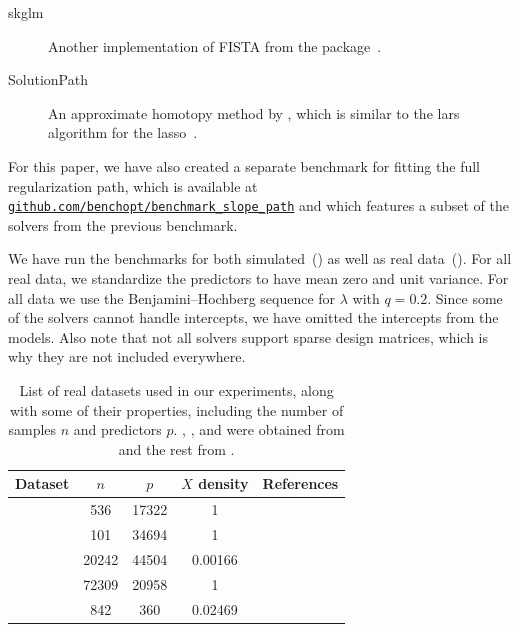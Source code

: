 \documentclass[article]{jss}
\let\Cref\crtCref
\newcommand{\myurl}[1]{\href{https://#1}{\nolinkurl{#1}}}
\begin{document}
\begin{description}
  \item[skglm] Another implementation of FISTA from the
         package~\citep{bertrand2022}.

  \item[SolutionPath] An approximate homotopy method by \citet{dupuis2024},
        which is similar to the lars algorithm for the lasso~\citep{efron2004}.
\end{description}

For this paper, we have also created a separate benchmark for fitting the full
regularization path, which is available at
\myurl{github.com/benchopt/benchmark\_slope\_path} and which features a subset
of the solvers from the previous benchmark.

We have run the benchmarks for both simulated~(\Cref{tab:simulated-data}) as
well as real data~(\Cref{tab:real-data}). For all real data, we standardize the
predictors to have mean zero and unit variance. For all data we use the
Benjamini--Hochberg sequence for \(\lambda\) with \(q=0.2\). Since some of the
solvers cannot handle intercepts, we have omitted the intercepts from the
models. Also note that not all solvers support sparse design matrices, which is
why they are not included everywhere.

\begin{table}[tp]
  \centering
  \begin{tabular}{
      l
      S[table-format=5.0]
      S[table-format=7.0]
      S[table-format=1.5,round-mode=figures,round-precision=2]
      p{5cm}
    }
    \toprule
    Dataset                    & {\(n\)} & {\(p\)} & {\(X\) density} & {References}                        \\
    \midrule
                & 536     & 17322   & 1               & \citet{nationalcancerinstitute2022} \\
     & 101     & 34694   & 1               & \citet{koussounadis2014}            \\
                 & 20242   & 44504   & 0.00166         & \citet{lewis2004}                   \\
             & 72309   & 20958   & 1               & \citet{mccallum2010}                \\
          & 842     & 360     & 0.02469         & \citet{scheetz2006}                 \\
    \bottomrule
  \end{tabular}
  \caption{%
    List of real datasets used in our experiments, along with some of
    their properties, including the number of samples \(n\) and predictors \(p\).
    , , and  were
    obtained from \citet{breheny2022} and the rest from \citet{chang2016}.
  }
  \label{tab:real-data}
\end{table}
\end{document}
